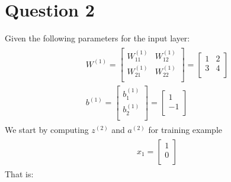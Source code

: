 \documentclass[leqno]{article}
\begin{document}
\section*{Question 2} Given the following parameters for the input layer:
\begin{gather*}
\begin{split}
&W^{(1)} =
  \begin{bmatrix}
  W_{11}^{(1)} & W_{12}^{(1)}\\
  W_{21}^{(1)} & W_{22}^{(1)}\\ 
  \end{bmatrix}
  =
  \begin{bmatrix}
  1 & 2\\
  3 & 4\\ 
  \end{bmatrix}
\\
&b^{(1)} =
   \begin{bmatrix}
  b_1^{(1)} \\
  b_2^{(1)}\\ 
  \end{bmatrix}
  =
  \begin{bmatrix}
  1 \\
  -1\\ 
  \end{bmatrix}
\end{split}
\end{gather*}
We start by computing $z^{(2)}$ and $a^{(2)}$ for training example 
\begin{gather*}
\begin{split}
&x_1 =
  \begin{bmatrix}
  1\\
  0\\ 
  \end{bmatrix}
\end{split}
\end{gather*}
That is: 
\end{document}
